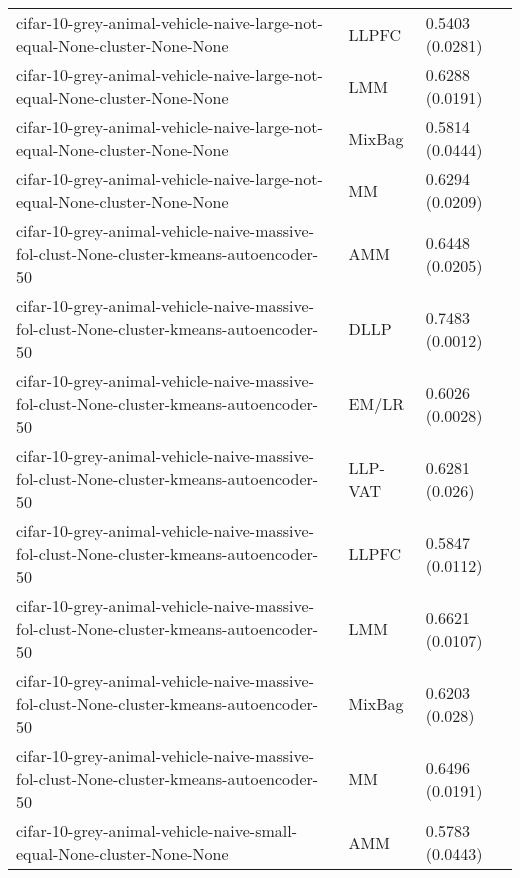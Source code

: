 \begin{longtable}{lll}
                                    cifar-10-grey-animal-vehicle-naive-large-not-equal-None-cluster-None-None &     LLPFC &                           0.5403 (0.0281) \\
                                    cifar-10-grey-animal-vehicle-naive-large-not-equal-None-cluster-None-None &       LMM &                           0.6288 (0.0191) \\
                                    cifar-10-grey-animal-vehicle-naive-large-not-equal-None-cluster-None-None &    MixBag &                           0.5814 (0.0444) \\
                                    cifar-10-grey-animal-vehicle-naive-large-not-equal-None-cluster-None-None &        MM &                           0.6294 (0.0209) \\
                      cifar-10-grey-animal-vehicle-naive-massive-fol-clust-None-cluster-kmeans-autoencoder-50 &       AMM &                           0.6448 (0.0205) \\
                      cifar-10-grey-animal-vehicle-naive-massive-fol-clust-None-cluster-kmeans-autoencoder-50 &      DLLP &                           0.7483 (0.0012) \\
                      cifar-10-grey-animal-vehicle-naive-massive-fol-clust-None-cluster-kmeans-autoencoder-50 &     EM/LR &                           0.6026 (0.0028) \\
                      cifar-10-grey-animal-vehicle-naive-massive-fol-clust-None-cluster-kmeans-autoencoder-50 &   LLP-VAT &                            0.6281 (0.026) \\
                      cifar-10-grey-animal-vehicle-naive-massive-fol-clust-None-cluster-kmeans-autoencoder-50 &     LLPFC &                           0.5847 (0.0112) \\
                      cifar-10-grey-animal-vehicle-naive-massive-fol-clust-None-cluster-kmeans-autoencoder-50 &       LMM &                           0.6621 (0.0107) \\
                      cifar-10-grey-animal-vehicle-naive-massive-fol-clust-None-cluster-kmeans-autoencoder-50 &    MixBag &                            0.6203 (0.028) \\
                      cifar-10-grey-animal-vehicle-naive-massive-fol-clust-None-cluster-kmeans-autoencoder-50 &        MM &                           0.6496 (0.0191) \\
                                        cifar-10-grey-animal-vehicle-naive-small-equal-None-cluster-None-None &       AMM &                           0.5783 (0.0443) \\

\end{longtable}
